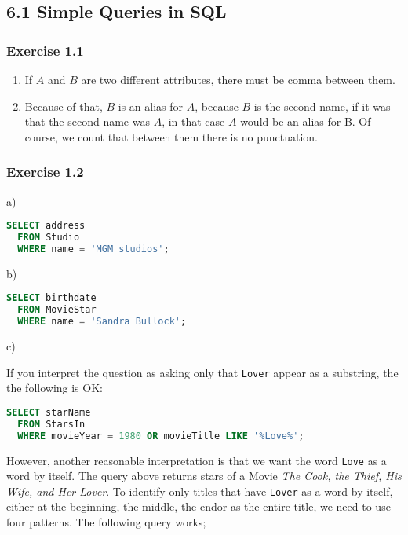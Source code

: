 \documentclass[../../main.tex]{subfiles}
\begin{document}
\subsection*{6.1 Simple Queries in SQL}

\subsubsection*{Exercise 1.1}

\begin{enumerate}
  \item If $A$ and $B$ are two different attributes, there
        must be comma between them.
  \item Because of that, $B$ is an alias for $A$, because
        $B$ is the second name, if it was that the second
        name was $A$, in that case $A$ would be an alias
        for B. Of course, we count that between them there
        is no punctuation.
\end{enumerate}

\subsubsection*{Exercise 1.2}


a)

\begin{lstlisting}[language=sql]
  SELECT address
  FROM Studio
  WHERE name = 'MGM studios';
\end{lstlisting}

b)

\begin{lstlisting}[language=sql]
  SELECT birthdate
  FROM MovieStar
  WHERE name = 'Sandra Bullock';
\end{lstlisting}

\hypertarget{Solution6.1.2c}{c)}

If you interpret the question as asking only that \verb|Lover|
appear as a substring, the the following is OK:

\begin{lstlisting}[language=sql]
  SELECT starName
  FROM StarsIn
  WHERE movieYear = 1980 OR movieTitle LIKE '%Love%';
\end{lstlisting}

However, another reasonable interpretation is that we want
the word \verb|Love| as a word by itself. The query above
returns stars of a Movie \emph{The Cook, the Thief, His
Wife, and Her Lover}. To identify only titles that have
\verb|Lover| as a word by itself, either at the beginning,
the middle, the endor as the entire title, we need to use
four patterns. The following query works;
\end{document}
